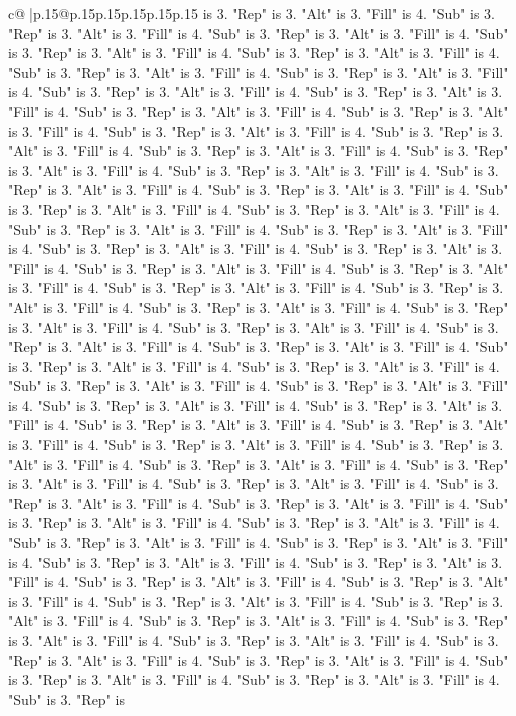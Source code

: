 \documentclass{article}
\begin{document}
{\begin{supertabular}{c@{$\;$}|p{.15\linewidth}@{}p{.15\linewidth}p{.15\linewidth}p{.15\linewidth}p{.15\linewidth}p{.15\linewidth}}
{{{is 3. "Rep" is 3. "Alt" is 3. "Fill" is 4. "Sub" is 3. "Rep" is 3. "Alt" is 3. "Fill" is 4. "Sub" is 3. "Rep" is 3. "Alt" is 3. "Fill" is 4. "Sub" is 3. "Rep" is 3. "Alt" is 3. "Fill" is 4. "Sub" is 3. "Rep" is 3. "Alt" is 3. "Fill" is 4. "Sub" is 3. "Rep" is 3. "Alt" is 3. "Fill" is 4. "Sub" is 3. "Rep" is 3. "Alt" is 3. "Fill" is 4. "Sub" is 3. "Rep" is 3. "Alt" is 3. "Fill" is 4. "Sub" is 3. "Rep" is 3. "Alt" is 3. "Fill" is 4. "Sub" is 3. "Rep" is 3. "Alt" is 3. "Fill" is 4. "Sub" is 3. "Rep" is 3. "Alt" is 3. "Fill" is 4. "Sub" is 3. "Rep" is 3. "Alt" is 3. "Fill" is 4. "Sub" is 3. "Rep" is 3. "Alt" is 3. "Fill" is 4. "Sub" is 3. "Rep" is 3. "Alt" is 3. "Fill" is 4. "Sub" is 3. "Rep" is 3. "Alt" is 3. "Fill" is 4. "Sub" is 3. "Rep" is 3. "Alt" is 3. "Fill" is 4. "Sub" is 3. "Rep" is 3. "Alt" is 3. "Fill" is 4. "Sub" is 3. "Rep" is 3. "Alt" is 3. "Fill" is 4. "Sub" is 3. "Rep" is 3. "Alt" is 3. "Fill" is 4. "Sub" is 3. "Rep" is 3. "Alt" is 3. "Fill" is 4. "Sub" is 3. "Rep" is 3. "Alt" is 3. "Fill" is 4. "Sub" is 3. "Rep" is 3. "Alt" is 3. "Fill" is 4. "Sub" is 3. "Rep" is 3. "Alt" is 3. "Fill" is 4. "Sub" is 3. "Rep" is 3. "Alt" is 3. "Fill" is 4. "Sub" is 3. "Rep" is 3. "Alt" is 3. "Fill" is 4. "Sub" is 3. "Rep" is 3. "Alt" is 3. "Fill" is 4. "Sub" is 3. "Rep" is 3. "Alt" is 3. "Fill" is 4. "Sub" is 3. "Rep" is 3. "Alt" is 3. "Fill" is 4. "Sub" is 3. "Rep" is 3. "Alt" is 3. "Fill" is 4. "Sub" is 3. "Rep" is 3. "Alt" is 3. "Fill" is 4. "Sub" is 3. "Rep" is 3. "Alt" is 3. "Fill" is 4. "Sub" is 3. "Rep" is 3. "Alt" is 3. "Fill" is 4. "Sub" is 3. "Rep" is 3. "Alt" is 3. "Fill" is 4. "Sub" is 3. "Rep" is 3. "Alt" is 3. "Fill" is 4. "Sub" is 3. "Rep" is 3. "Alt" is 3. "Fill" is 4. "Sub" is 3. "Rep" is 3. "Alt" is 3. "Fill" is 4. "Sub" is 3. "Rep" is 3. "Alt" is 3. "Fill" is 4. "Sub" is 3. "Rep" is 3. "Alt" is 3. "Fill" is 4. "Sub" is 3. "Rep" is 3. "Alt" is 3. "Fill" is 4. "Sub" is 3. "Rep" is 3. "Alt" is 3. "Fill" is 4. "Sub" is 3. "Rep" is 3. "Alt" is 3. "Fill" is 4. "Sub" is 3. "Rep" is 3. "Alt" is 3. "Fill" is 4. "Sub" is 3. "Rep" is 3. "Alt" is 3. "Fill" is 4. "Sub" is 3. "Rep" is 3. "Alt" is 3. "Fill" is 4. "Sub" is 3. "Rep" is 3. "Alt" is 3. "Fill" is 4. "Sub" is 3. "Rep" is 3. "Alt" is 3. "Fill" is 4. "Sub" is 3. "Rep" is 3. "Alt" is 3. "Fill" is 4. "Sub" is 3. "Rep" is 3. "Alt" is 3. "Fill" is 4. "Sub" is 3. "Rep" is 3. "Alt" is 3. "Fill" is 4. "Sub" is 3. "Rep" is 3. "Alt" is 3. "Fill" is 4. "Sub" is 3. "Rep" is 3. "Alt" is 3. "Fill" is 4. "Sub" is 3. "Rep" is 3. "Alt" is 3. "Fill" is 4. "Sub" is 3. "Rep" is 3. "Alt" is 3. "Fill" is 4. "Sub" is 3. "Rep" is 3. "Alt" is 3. "Fill" is 4. "Sub" is 3. "Rep" is 3. "Alt" is 3. "Fill" is 4. "Sub" is 3. "Rep" is 3. "Alt" is 3. "Fill" is 4. "Sub" is 3. "Rep" is 3. "Alt" is 3. "Fill" is 4. "Sub" is 3. "Rep" is 3. "Alt" is 3. "Fill" is 4. "Sub" is 3. "Rep" is 3. "Alt" is 3. "Fill" is 4. "Sub" is 3. "Rep" is 3. "Alt" is 3. "Fill" is 4. "Sub" is 3. "Rep" is 3. "Alt" is 3. "Fill" is 4. "Sub" is 3. "Rep" is 3. "Alt" is 3. "Fill" is 4. "Sub" is 3. "Rep" is 3. "Alt" is 3. "Fill" is 4. "Sub" is 3. "Rep" is 3. "Alt" is 3. "Fill" is 4. "Sub" is 3. "Rep" is 3. "Alt" is 3. "Fill" is 4. "Sub" is 3. "Rep" is }}}
\end{supertabular}}
\end{document}
